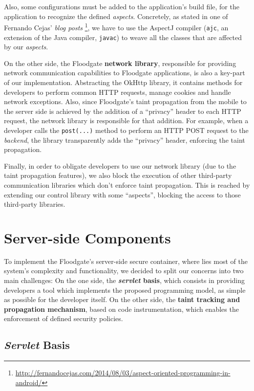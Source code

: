 Also, some configurations must be added to the application's build file, for the application to recognize the defined \textit{aspects}. Concretely, as stated in one of Fernando Cejas' \textit{blog posts} \footnote{\url{http://fernandocejas.com/2014/08/03/aspect-oriented-programming-in-android/}}, we have to use the AspectJ compiler (\texttt{ajc}, an extension of the Java compiler, \texttt{javac}) to weave all the classes that are affected by our \textit{aspects}.

On the other side, the Floodgate \textbf{network library}, responsible for providing network communication capabilities to Floodgate applications, is also a key-part of our implementation. Abstracting the OkHttp library, it contains methods for developers to perform common HTTP requests, manage cookies and handle network exceptions. Also, since Floodgate's taint propagation from the mobile to the server side is achieved by the addition of a ``privacy'' header to each HTTP request, the network library is responsible for that addition. For example, when a developer calls the \texttt{post(...)} method to perform an HTTP POST request to the \textit{backend}, the library transparently adds the ``privacy'' header, enforcing the taint propagation.

Finally, in order to obligate developers to use our network library (due to the taint propagation features), we also block the execution of other third-party communication libraries which don't enforce taint propagation. This is reached by extending our control library with some ``aspects'', blocking the access to those third-party libraries.

\section{Server-side Components}
\label{sec:server-components}

To implement the Floodgate's server-side secure container, where lies most of the system's complexity and functionality, we decided to split our concerns into two main challenges: On the one side, the \textbf{\textit{servlet} basis}, which consists in providing developers a tool which implements the proposed programming model, as simple as possible for the developer itself. On the other side, the \textbf{taint tracking and propagation mechanism}, based on code instrumentation, which enables the enforcement of defined security policies.

\subsection{\textit{Servlet} Basis}

